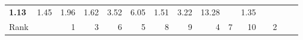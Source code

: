 \begin{tabular}{ll|rrrrrr|rrrrrrr}
  


  
  \textbf{1.13} & 1.45 & 1.96 & 1.62 & 3.52 & 6.05 & 1.51 & 3.22 & 13.28 &  & 1.35 \\

  Rank & &
  1 & 3 & 6 & 5 & 8 & 9 & 4 & 7 & 10 &  & 2 \\\hline\hline
  

\end{tabular}
